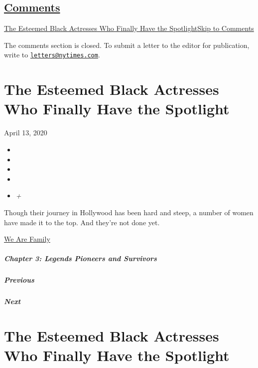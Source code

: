 \hypertarget{comments}{%
\subsection{\texorpdfstring{\protect\hyperlink{commentsContainer}{Comments}}{Comments}}\label{comments}}

\href{}{The Esteemed Black Actresses Who Finally Have the
Spotlight}\href{}{Skip to Comments}

The comments section is closed. To submit a letter to the editor for
publication, write to
\href{mailto:letters@nytimes.com}{\nolinkurl{letters@nytimes.com}}.

\hypertarget{the-esteemed-black-actresses-who-finally-have-the-spotlight}{%
\section{The Esteemed Black Actresses Who Finally Have the
Spotlight}\label{the-esteemed-black-actresses-who-finally-have-the-spotlight}}

April 13, 2020

\begin{itemize}
\item
\item
\item
\item
\item
  \emph{+}
\end{itemize}

Though their journey in Hollywood has been hard and steep, a number of
women have made it to the top. And they're not done yet.

\href{https://www.nytimes.com/interactive/2020/04/13/t-magazine/culture-issue-2020.html}{We
Are Family}

\hypertarget{chapter-3-legends-pioneers-and-survivors}{%
\subparagraph{Chapter 3: Legends Pioneers and
Survivors}\label{chapter-3-legends-pioneers-and-survivors}}

\hypertarget{previous}{%
\subparagraph{Previous}\label{previous}}

\hypertarget{next}{%
\subparagraph{Next}\label{next}}

\hypertarget{the-esteemed-black-actresses-who-finally-have-the-spotlight-1}{%
\section{The Esteemed Black Actresses Who Finally Have the
Spotlight}\label{the-esteemed-black-actresses-who-finally-have-the-spotlight-1}}

